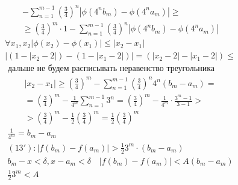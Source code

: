 \documentclass[main]{subfiles}
\begin{document}
\begin{example}
\begin{multline*}
          -\sum_{n=1}^{m-1} \left( \frac{3}{4} \right)^n | \phi(4^nb_m) - \phi(4^na_m)| \geq \\
           \geq   \left( \frac{3}{4} \right)^m \cdot 1 
          - \sum^{m-1}_{n=1} \left( \frac{3}{4} \right)^n |\phi(4^nb_m)-\phi(4^na_m)|\end{multline*}
          \begin{gather*}
          \forall x_1, x_2 |\phi(x_2) - \phi(x_1)| \leq |x_2 -x_1| \tag{12} \\
          |(1-|x_2-2|) - (1-|x_1-2|)| = (|x_2-2| - |x_1-2|) \leq \\
          \text{ дальше не будем расписывать неравенство треугольника} 
          \end{gather*}
          \begin{multline*}
 |x_2-x_1|\geq \left( \frac{3}{4} \right)^m - \sum_{n=1}^{m-1} \left( \frac{3}{4} \right)^n
          4^n(b_m - a_m) =\\
          = \left( \frac{3}{4} \right)^m - \frac{1}{4^m} \sum_{n=1}^{m-1}3^n =
          \left( \frac{3}{4} \right)^m - \frac{1}{4^m} \cdot \frac{3^m-1}{3-1} > \\ 
          > \left( \frac{3}{4} \right)^m - \frac{1}{2} \left( \frac{3}{4} \right)^m
          = \frac{1}{2} \left( \frac{3}{4} \right)^m \tag{13} \end{multline*}
          \begin{gather*}
          \frac{1}{4^m} = b_m - a_m \\
          (13\prime) : |f(b_m) - f(a_m)| > \frac{1}{2} 3^m \cdot (b_m-a_m) \\
          b_m - x < \delta, x - a_m < \delta \quad |f(b_m) - f(a_m)| < A (b_m-a_m) \\
          \frac{1}{2} 3^m < A
     \end{gather*} 
\end{example}
\end{document}
